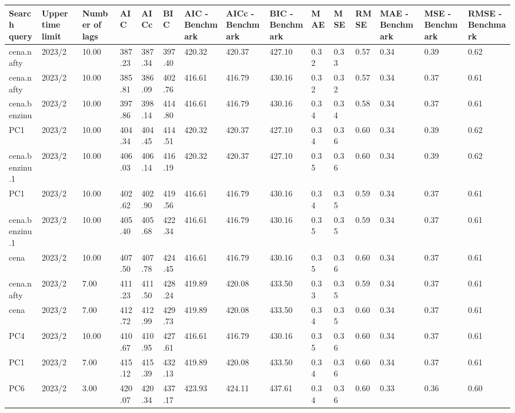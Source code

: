 \begin{longtable}{p{1.5cm}p{1.0cm}p{1.5cm}p{1.0cm}p{1.0cm}p{1.0cm}p{1.0cm}p{1.0cm}p{1.0cm}p{1.0cm}p{1.0cm}p{1.0cm}p{1.0cm}p{1.0cm}p{1.0cm}}
  \hline
Search query & Upper time limit & Number of lags & AIC & AICc & BIC & AIC - Benchmark & AICc - Benchmark & BIC - Benchmark & MAE & MSE & RMSE & MAE - Benchmark & MSE - Benchmark & RMSE - Benchmark \\ 
  \hline
cena.nafty & 2023/2 & 10.00 & 387.23 & 387.34 & 397.40 & 420.32 & 420.37 & 427.10 & 0.32 & 0.33 & 0.57 & 0.34 & 0.39 & 0.62 \\ 
  cena.nafty & 2023/2 & 10.00 & 385.81 & 386.09 & 402.76 & 416.61 & 416.79 & 430.16 & 0.32 & 0.32 & 0.57 & 0.34 & 0.37 & 0.61 \\ 
  cena.benzinu & 2023/2 & 10.00 & 397.86 & 398.14 & 414.80 & 416.61 & 416.79 & 430.16 & 0.34 & 0.34 & 0.58 & 0.34 & 0.37 & 0.61 \\ 
  PC1 & 2023/2 & 10.00 & 404.34 & 404.45 & 414.51 & 420.32 & 420.37 & 427.10 & 0.34 & 0.36 & 0.60 & 0.34 & 0.39 & 0.62 \\ 
  cena.benzinu.1 & 2023/2 & 10.00 & 406.03 & 406.14 & 416.19 & 420.32 & 420.37 & 427.10 & 0.35 & 0.36 & 0.60 & 0.34 & 0.39 & 0.62 \\ 
  PC1 & 2023/2 & 10.00 & 402.62 & 402.90 & 419.56 & 416.61 & 416.79 & 430.16 & 0.34 & 0.35 & 0.59 & 0.34 & 0.37 & 0.61 \\ 
  cena.benzinu.1 & 2023/2 & 10.00 & 405.40 & 405.68 & 422.34 & 416.61 & 416.79 & 430.16 & 0.35 & 0.35 & 0.59 & 0.34 & 0.37 & 0.61 \\ 
  cena & 2023/2 & 10.00 & 407.50 & 407.78 & 424.45 & 416.61 & 416.79 & 430.16 & 0.35 & 0.36 & 0.60 & 0.34 & 0.37 & 0.61 \\ 
  cena.nafty & 2023/2 & 7.00 & 411.23 & 411.50 & 428.24 & 419.89 & 420.08 & 433.50 & 0.33 & 0.35 & 0.59 & 0.34 & 0.37 & 0.61 \\ 
  cena & 2023/2 & 7.00 & 412.72 & 412.99 & 429.73 & 419.89 & 420.08 & 433.50 & 0.34 & 0.35 & 0.60 & 0.34 & 0.37 & 0.61 \\ 
  PC4 & 2023/2 & 10.00 & 410.67 & 410.95 & 427.61 & 416.61 & 416.79 & 430.16 & 0.35 & 0.36 & 0.60 & 0.34 & 0.37 & 0.61 \\ 
  PC1 & 2023/2 & 7.00 & 415.12 & 415.39 & 432.13 & 419.89 & 420.08 & 433.50 & 0.34 & 0.36 & 0.60 & 0.34 & 0.37 & 0.61 \\ 
  PC6 & 2023/2 & 3.00 & 420.07 & 420.34 & 437.17 & 423.93 & 424.11 & 437.61 & 0.34 & 0.36 & 0.60 & 0.33 & 0.36 & 0.60 \\ 

\end{longtable}
